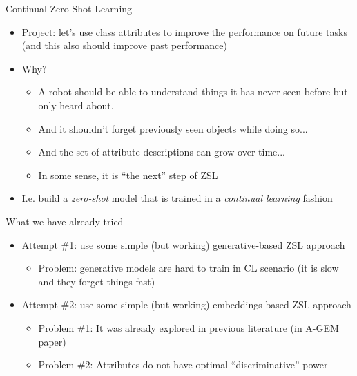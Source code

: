 \documentclass[10pt]{beamer}
\begin{document}
\begin{frame}{Continual Zero-Shot Learning}
    \begin{itemize}
        \item\pause Project: let's use class attributes to improve the performance on future tasks (and this also should improve past performance)
        \item\pause Why?
            \begin{itemize}
                \item\pause A robot should be able to understand things it has never seen before but only heard about.
                \item\pause And it shouldn't forget previously seen objects while doing so...
                \item\pause And the set of attribute descriptions can grow over time...
                \item\pause In some sense, it is ``the next'' step of ZSL
            \end{itemize}
        \item\pause I.e. build a \textit{zero-shot} model that is trained in a \textit{continual learning} fashion
    \end{itemize}
\end{frame}

\begin{frame}{What we have already tried}
    \begin{itemize}
        \item\pause Attempt \#1: use some simple (but working) generative-based ZSL approach
        \begin{itemize}
            \item\pause Problem: generative models are hard to train in CL scenario (it is slow and they forget things fast)
        \end{itemize}
        \item\pause Attempt \#2: use some simple (but working) embeddings-based ZSL approach
        \begin{itemize}
            \item\pause Problem \#1: It was already explored in previous literature (in A-GEM paper)
            \item\pause Problem \#2: Attributes do not have optimal ``discriminative'' power
        \end{itemize}
    \end{itemize}
\end{frame}
\end{document}
